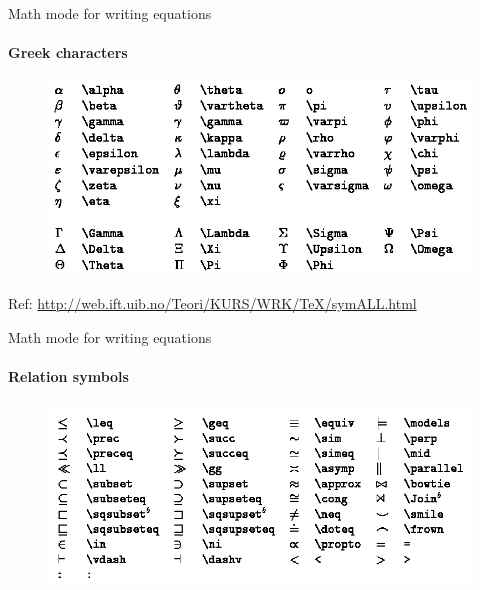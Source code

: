 \documentclass [9pt] {beamer}
\begin{document}
\begin{frame}{Math mode for writing equations}
\framesubtitle{Greek characters}
\begin{figure}
	\centering
	\includegraphics[width=\linewidth]{t1}
	\label{fig:t1}
	\end{figure}

Ref: \tiny \url{http://web.ift.uib.no/Teori/KURS/WRK/TeX/symALL.html}
\end{frame}


\begin{frame}{Math mode for writing equations}
\framesubtitle{Relation symbols}

\begin{figure}
	\centering
	\includegraphics[width=\linewidth]{t3}
	\label{fig:t3}
\end{figure}
\end{frame}
\end{document}
